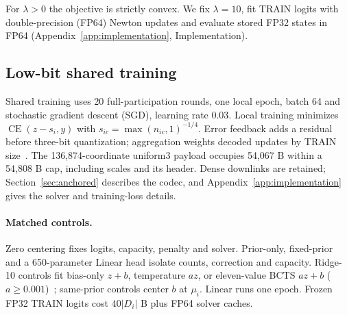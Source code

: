 For $\lambda>0$ the objective is strictly convex. We fix $\lambda=10$, fit TRAIN logits with double-precision (FP64) Newton updates and evaluate stored FP32 states in FP64 (Appendix~\ref{app:implementation}, Implementation).

\subsection{Low-bit shared training}
Shared training uses 20 full-participation rounds, one local epoch, batch 64 and stochastic gradient descent (SGD), learning rate $0.03$. Local training minimizes $\operatorname{CE}(z-s_i,y)$ with $s_{ic}=\max(n_{ic},1)^{-1/4}$. Error feedback adds a residual before three-bit quantization; aggregation weights decoded updates by TRAIN size~\cite{karimireddy2019errorfeedback}. The 136,874-coordinate uniform3 payload occupies 54,067 B within a 54,808 B cap, including scales and its header. Dense downlinks are retained; Section~\ref{sec:anchored} describes the codec, and Appendix~\ref{app:implementation} gives the solver and training-loss details.

\paragraph{Matched controls.}
Zero centering fixes logits, capacity, penalty and solver. Prior-only, fixed-prior and a 650-parameter Linear head isolate counts, correction and capacity. Ridge-10 controls fit bias-only $z+b$, temperature $az$, or eleven-value BCTS $az+b$ ($a\ge0.001$)~\cite{guo2017calibration,alexandari2020labelshift}; same-prior controls center $b$ at $\mu_i$. Linear runs one epoch. Frozen FP32 TRAIN logits cost $40|D_i|$ B plus FP64 solver caches.
